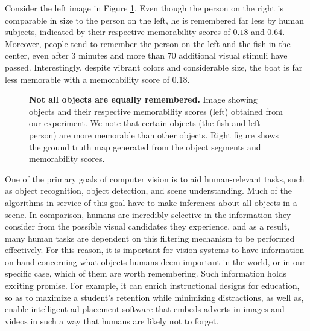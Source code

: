 Consider the left image in Figure \ref{fig:introPhoto}. Even though the person on the right is comparable in size to the person on the left, he is remembered far less by human subjects, indicated by their respective memorability scores of $0.18$ and $0.64$. Moreover, people tend to remember the person on the left and the fish in the center, even after $3$ minutes and  more than 70 additional visual stimuli have passed. Interestingly, despite vibrant colors and considerable size, the boat is far less memorable with a memorability score of $0.18$.

\begin{figure}[t]
\centering
{}
\vspace{-12pt}\caption{\footnotesize\textbf{Not all objects are equally remembered.} Image showing objects and their respective memorability scores (left) obtained from our experiment. We note that certain objects (the fish and left person) are more memorable than other objects. Right figure shows the ground truth map generated from the object segments and memorability scores.}\label{fig:introPhoto}\vspace{-15pt}
\end{figure}


One of the primary goals of computer vision is to aid human-relevant tasks, such as object recognition, object detection, and scene understanding. Much of the algorithms in service of this goal have to make inferences about all objects in a scene. In comparison, humans are incredibly selective in the information they consider from the possible visual candidates they experience, and as a result, many human tasks are dependent on this filtering mechanism to be performed effectively. For this reason, it is important for vision systems to have information on hand concerning what objects humans deem important in the world, or in our specific case, which of them are worth remembering. Such information holds exciting promise. For example, it can enrich instructional designs for education, so as to maximize a student's retention while minimizing distractions, as well as, enable intelligent ad placement software that embeds adverts in images and videos in such a way that humans are likely not to forget.

